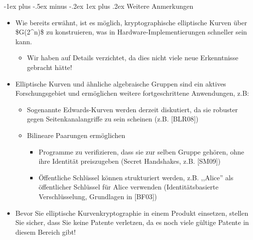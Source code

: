 \documentclass[a4paper]{article}
\makeatletter
\renewcommand{\subsubsection}{\@startsection{subsubsection}{3}{0mm}%
 {-1ex plus -.5ex minus -.2ex}%
 {1ex plus .2ex}%
 {\normalfont\small\bfseries}}
\makeatother
\begin{document}
\begin{multicols}{3}
    \subsubsection{Weitere Anmerkungen}

    \begin{itemize}
        \item
              Wie bereits erwähnt, ist es möglich, kryptographische elliptische
              Kurven über \$G(2\^{}n)\$ zu konstruieren, was in
              Hardware-Implementierungen schneller sein kann.

              \begin{itemize}
                  \item
                        Wir haben auf Details verzichtet, da dies nicht viele neue
                        Erkenntnisse gebracht hätte!
              \end{itemize}
        \item
              Elliptische Kurven und ähnliche algebraische Gruppen sind ein aktives
              Forschungsgebiet und ermöglichen weitere fortgeschrittene Anwendungen,
              z.B:

              \begin{itemize}
                  \item
                        Sogenannte Edwards-Kurven werden derzeit diskutiert, da sie robuster
                        gegen Seitenkanalangriffe zu sein scheinen (z.B. {[}BLR08{]})
                  \item
                        Bilineare Paarungen ermöglichen

                        \begin{itemize}
                            \item
                                  Programme zu verifizieren, dass sie zur selben Gruppe gehören,
                                  ohne ihre Identität preiszugeben (Secret Handshakes, z.B.
                                  {[}SM09{]})
                            \item
                                  Öffentliche Schlüssel können strukturiert werden, z.B. ,,Alice''
                                  als öffentlicher Schlüssel für Alice verwenden (Identitätsbasierte
                                  Verschlüsselung, Grundlagen in {[}BF03{]})
                        \end{itemize}
              \end{itemize}
        \item
              Bevor Sie elliptische Kurvenkryptographie in einem Produkt einsetzen,
              stellen Sie sicher, dass Sie keine Patente verletzen, da es noch viele
              gültige Patente in diesem Bereich gibt!
    \end{itemize}



\end{multicols}
\end{document}
